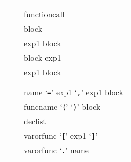\documentclass[11pt]{article}
\renewcommand{\ter}[1]{{\rm`{\tt#1}'}}
\begin{document}
\renewenvironment{Produc}{\vspace{0.8ex}\par\noindent\hspace{3ex}\it\begin{tabular}{rrl}}{\end{tabular}\vspace{0.8ex}\par\noindent}

\renewcommand{\OrNL}{\\ & \Or & }

\begin{Produc}

\produc{chunk}{\rep{stat} \opt{\ter{;}}}

\produc{block}{chunk}

\produc{stat}{%
	varlist1 \ter{=} explist1
\OrNL	functioncall
\OrNL	\rwd{do} block \rwd{end}
\OrNL	\rwd{while} exp1 \rwd{do} block \rwd{end}
\OrNL	\rwd{repeat} block \rwd{until} exp1
\OrNL	\rwd{if} exp1 \rwd{then} block
	\rep{\rwd{elseif} exp1 \rwd{then} block}
	\opt{\rwd{else} block} \rwd{end}
\OrNL	\rwd{return} \opt{explist1}
\OrNL	\rwd{break}
\OrNL	\rwd{for} name \ter{=} exp1 \ter{,} exp1 \opt{\ter{,} exp1}
	\rwd{do} block \rwd{end}
\OrNL	\rwd{function} funcname \ter{(} \opt{parlist1} \ter{)} block \rwd{end}
\OrNL	\rwd{local} declist \opt{init}
}

\produc{var}{%
	name
\OrNL	varorfunc \ter{[} exp1 \ter{]}
\OrNL	varorfunc \ter{.} name
}

\produc{varorfunc}{var \Or functioncall}

\produc{varlist1}{var \rep{\ter{,} var}}

\produc{declist}{name \rep{\ter{,} name}}

\produc{init}{\ter{=} explist1}

\produc{exp}{%
	\rwd{nil}
\Or	number
\Or	literal
\Or	function
\Or	upvalue
\Or	functioncall
\Or	tableconstructor
\Or	\ter{(} exp \ter{)}
\Or	exp binop exp
\Or	unop exp
}

\produc{exp1}{exp}

\produc{explist1}{\rep{exp1 \ter{,}} exp}


\produc{tableconstructor}{\ter{\{} fieldlist \ter{\}}}
\produc{fieldlist}{%
	lfieldlist
\Or	ffieldlist
\Or	lfieldlist \ter{;} ffieldlist
\Or	ffieldlist \ter{;} lfieldlist
}
\produc{lfieldlist}{\opt{lfieldlist1}}
\produc{ffieldlist}{\opt{ffieldlist1}}
\produc{lfieldlist1}{exp \rep{\ter{,} exp} \opt{\ter{,}}}
\produc{ffieldlist1}{ffield \rep{\ter{,} ffield} \opt{\ter{,}}}
\produc{ffield}{%
	\ter{[} exp \ter{]} \ter{=} exp
\Or	name \ter{=} exp
}


\end{Produc}
\end{document}

